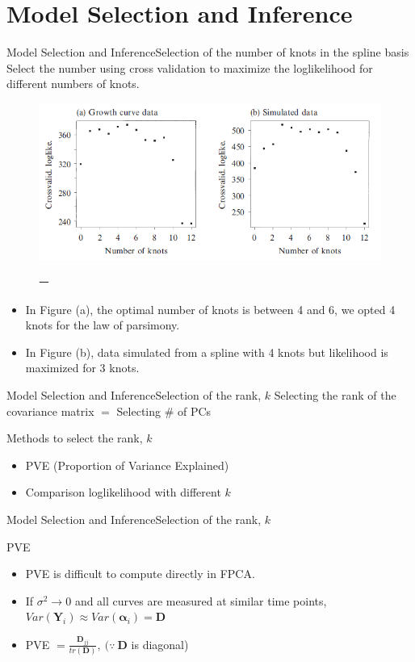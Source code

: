 \documentclass{beamer}
\def \bY {\mathbf{Y}}
\def \balpha {\boldsymbol{\alpha}}
\begin{document}
\section{Model Selection and Inference}
\begin{frame}{Model Selection and Inference}{Selection of the number of knots in the spline basis}
	Select the number using cross validation to maximize the loglikelihood for different numbers of knots.
	\begin{figure}[h] %
		\begin{center}
			\includegraphics[width=0.7\linewidth]{img/7.png}
		\end{center}
		\label{fig:long}ㅡ
		\label{fig:onecol}
	\end{figure}
	\begin{itemize}
		\item {
			In Figure (a), the optimal number of knots is between 4 and 6, we opted 4 knots for the law of parsimony.
		}
		\item {
			In Figure (b), data simulated from a spline with 4 knots but likelihood is maximized for 3 knots.
		}
	\end{itemize}
\end{frame}

\begin{frame}{Model Selection and Inference}{Selection of the rank, $k$}
	Selecting the rank of the covariance matrix $=$ Selecting \# of PCs
	\begin{block}{Methods to select the rank, $k$}
		\begin{itemize}
			\item {
				PVE (Proportion of Variance Explained)
			}
			\item {
				Comparison loglikelihood with different $k$
			}
		\end{itemize}
	\end{block}
\end{frame}

\begin{frame}{Model Selection and Inference}{Selection of the rank, $k$}
	\begin{block}{PVE}
		\begin{itemize}
			\item {
				PVE is difficult to compute directly in FPCA.
			}
			\item {
				If $\sigma^2 \rightarrow 0$ and all curves are measured at similar time points, $Var(\bY_i) \approx Var(\balpha_i) = \mathbf{D}$
			}
			\item {
				PVE $= \frac{\mathbf{D}_{jj}}{tr(\mathbf{D})}, \ (\because \ \mathbf{D} $ is diagonal)
			}
		\end{itemize}
	\end{block}
\end{frame}
\end{document}
